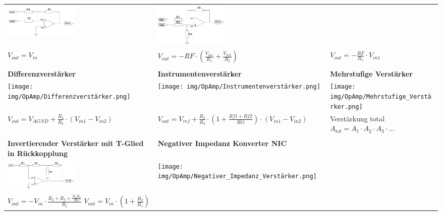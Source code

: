 \documentclass[margin=normal]{tex/hsrzf}
\begin{document}
\begin{tabularx}{0.8\textwidth}{p{155pt}p{155pt}p{155pt}}
  \includegraphics[width = 3.5cm]{img/OpAmp/Invertierender_Addierer.png}                            &
  \includegraphics[width = 3.5cm]{img/OpAmp/Gewichteter_Subtrahierer.png}                             \\
  $ V_{out} = V_{in}$                                                                               &
  $ V_{out} = - RF \cdot (\frac{V_{in1}}{R_1} + \frac{V_{in2}}{R_2}) $                              &
  $ V_{out} =-\frac{RF}{R_1} \cdot V_{in1} $                                                          \\
  \\
  \textbf{Differenzverstärker}                                                                      &
  \textbf{Instrumentenverstärker}                                                                   &
  \textbf{Mehrstufige Verstärker}                                                                     \\
  \texttt{[image: img/OpAmp/Differenzverstärker.png]}                                &
  \texttt{[image: img/OpAmp/Instrumentenverstärker.png]}                             &
  \texttt{[image: img/OpAmp/Mehrstufige\_Verstärker.png]}                               \\
  $ V_{out} = V_{AGND} + \frac{R_4}{R_3} \cdot(V_{in1} - V_{in2}) $                                 &
  $ V_{out} = V_{ref} + \frac{R_4}{R_3} \cdot (1 + \frac{Rf1 + Rf2}{RG}) \cdot (V_{in1} - V_{in2})$ &
  Verstärkung total $ A_{tot} = A_1 \cdot A_2 \cdot A_3\cdot\dots$                                    \\
  \\
  \textbf{Invertierender Verstärker \newline
  mit T-Glied in Rückkopplung}                                                                      &
  \textbf{Negativer Impedanz Konverter NIC}                                                           \\
  \includegraphics[width = 3.5cm]{img/OpAmp/Invertierender_Verstärker_mit_T-Glied_Rückkopplung.png} &
  \texttt{[image: img/OpAmp/Negativer\_Impedanz\_Verstärker.png]}                        \\
  $ V_{out} = - V_{in} \cdot \frac{R_2 + R_3 + \frac{R_2R_3}{R4}}{R_1} $
  \newline
  $ V_{out} = V_{in} \cdot (1+ \frac{R_2}{R_1})$                                                    &
  \\
\end{tabularx}
\endgroup
\end{document}
